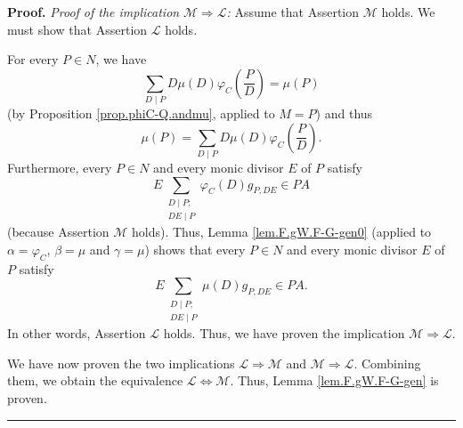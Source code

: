 \documentclass[numbers=enddot,12pt,final,onecolumn,notitlepage]{scrartcl}%
\theoremstyle{definition}
\newenvironment{proof}[1][Proof]{\noindent\textbf{#1.} }{\ \rule{0.5em}{0.5em}}
\let\sumnonlimits\sum
\renewcommand{\sum}{\sumnonlimits\limits}
\begin{document}
\begin{proof}
\textit{Proof of the implication }$\mathcal{M}\Longrightarrow\mathcal{L}%
$\textit{:} Assume that Assertion $\mathcal{M}$ holds. We must show that
Assertion $\mathcal{L}$ holds.

For every $P\in N$, we have%
\[
\sum_{D\mid P}D\mu\left(  D\right)  \varphi_{C}\left(  \dfrac{P}{D}\right)
=\mu\left(  P\right)
\]
(by Proposition \ref{prop.phiC-Q.andmu}, applied to $M=P$) and thus%
\[
\mu\left(  P\right)  =\sum_{D\mid P}D\mu\left(  D\right)  \varphi_{C}\left(
\dfrac{P}{D}\right)  .
\]
Furthermore, every $P\in N$ and every monic divisor $E$ of $P$ satisfy%
\[
E\sum_{\substack{D\mid P;\\DE\mid P}}\varphi_{C}\left(  D\right)  g_{P,DE}\in
PA
\]
(because Assertion $\mathcal{M}$ holds). Thus, Lemma \ref{lem.F.gW.F-G-gen0}
(applied to $\alpha=\varphi_{C}$, $\beta=\mu$ and $\gamma=\mu$) shows that
every $P\in N$ and every monic divisor $E$ of $P$ satisfy%
\[
E\sum_{\substack{D\mid P;\\DE\mid P}}\mu\left(  D\right)  g_{P,DE}\in PA.
\]
In other words, Assertion $\mathcal{L}$ holds. Thus, we have proven the
implication $\mathcal{M}\Longrightarrow\mathcal{L}$.

We have now proven the two implications $\mathcal{L}\Longrightarrow
\mathcal{M}$ and $\mathcal{M}\Longrightarrow\mathcal{L}$. Combining them, we
obtain the equivalence $\mathcal{L}\Longleftrightarrow\mathcal{M}$. Thus,
Lemma \ref{lem.F.gW.F-G-gen} is proven.
\end{proof}
\end{document}
